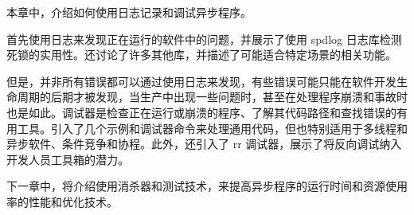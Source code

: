 本章中，介绍如何使用日志记录和调试异步程序。

首先使用日志来发现正在运行的软件中的问题，并展示了使用 spdlog 日志库检测死锁的实用性。还讨论了许多其他库，并描述了可能适合特定场景的相关功能。

但是，并非所有错误都可以通过使用日志来发现，有些错误可能只能在软件开发生命周期的后期才被发现，当生产中出现一些问题时，甚至在处理程序崩溃和事故时也是如此。调试器是检查正在运行或崩溃的程序、了解其代码路径和查找错误的有用工具。引入了几个示例和调试器命令来处理通用代码，但也特别适用于多线程和异步软件、条件竞争和协程。此外，还引入了 rr 调试器，展示了将反向调试纳入开发人员工具箱的潜力。

下一章中，将介绍使用消杀器和测试技术，来提高异步程序的运行时间和资源使用率的性能和优化技术。